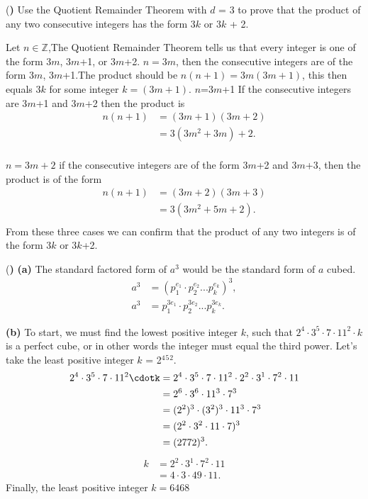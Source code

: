 \documentclass[12pt]{article}
\newcounter{problemnum}
\newcommand{\newprob}{\addtocounter{problemnum}{1} \noindent (\textbf{\arabic{problemnum}) }}
\begin{document}
\newprob Use the Quotient Remainder Theorem with $d$ = 3 to prove that the product of any two
consecutive integers has the form $3$$k$ or $3$$k$ + 2.

Let $n \in \mathbb{Z }$,\space The Quotient Remainder Theorem tells us that every integer is one of the form 3$m$, 3$m$+1, or 3$m$+2.
\newline
\newline
[Case 1] $n=3m$, then the consecutive integers are of the form 3$m$, 3$m$+1.The product should be $n(n+1)=3m(3m+1)$, this then equals 3$k$ for some integer $k=(3m+1)$.
\newline
\newline
[Case 2] $n$=3$m$+1 If the consecutive integers are 3$m$+1 and 3$m$+2 then the product is
\begin{align*}
n(n+1)
&=(3m+1)(3m+2)\\
&= 3(3m^2 +3m)+2. \\
\end{align*}

\newline
\newline
[Case 3] $n=3m+2$ if the consecutive integers are of the form 3$m$+2 and 3$m$+3, then the product is of the form
\begin{align*}
n(n+1)
&=(3m+2)(3m+3) \\
&=3(3m^2+5m+2).  \\
\end{align*}
From these three cases we can confirm that the product of any two integers is of the form 3$k$ or 3$k$+2.

\newprob \newline
\newline
\textbf{(a)} The standard factored form of $a$$^3$ would be the standard form of $a$ cubed.\newline
\begin{align*}
a^3
&=(p_1^{e_1}\cdot p_2^{e_2}...p_k^{e_k})^3,\\
a^3
&= p_1^{3e_1}\cdotp p_2^{3e_2}...p_k^{3e_k}.
\end{align*}


\textbf{(b)} To start, we must find the lowest positive integer $k$, such that $2^4\cdot3^5\cdot7\cdot11^2\cdot k$
is a perfect cube, or in other words the integer must equal the third power. Let's take the least positive integer $k$ =  2$^4$$^5$$^2$.
\begin{align*}
2^4\cdot3^5\cdot7\cdot11^2\cdotk  &=2^4\cdot3^5\cdot7\cdot11^2\cdot2^2\cdot3^1\cdot7^2\cdot11\\
&=2^6\cdot3^6\cdot11^3\cdot7^3\\
&=(2^2)^3\cdot(3^2)^3\cdot11^3\cdot7^3\\
&=(2^2\cdot3^2\cdot11\cdot7)^3\\
&=(2772)^3.\\
\end{align*}
\begin{align*}
k
&=2^2\cdot3^1\cdot7^2\cdot11\\
&=4\cdot3\cdot49\cdot11.
\end{align*}
Finally, the least positive integer
$k = 6468$
\end{document}

